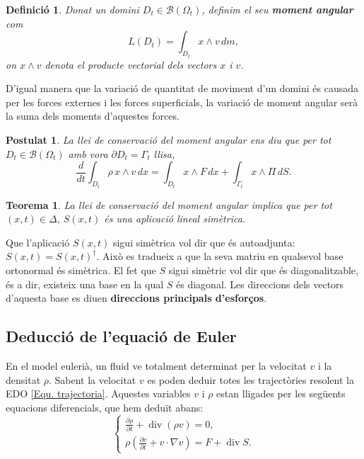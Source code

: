 \documentclass{article}
\numberwithin{equation}{section}
\DeclareMathOperator{\diver}{div}
\newtheorem{teorema}{Teorema}[section]
\newtheorem{definicio}{Definici\'{o}}[section]
\newtheorem{postulat}{Postulat}[section]
\begin{document}
\begin{definicio}
Donat un domini $D_t\in\mathcal{B}(\Omega_t)$, definim el seu \textbf{moment angular} com
\begin{equation}
L(D_t)=\int_{D_t}x\wedge v\,dm,
\end{equation}
on $x\wedge v$ denota el producte vectorial dels vectors $x$ i $v$.
\end{definicio}

D'igual manera que la variaci\'{o} de quantitat de moviment d'un domini \'{e}s causada per les forces externes i les forces superficials, la variaci\'{o} de moment angular ser\`{a} la suma dels moments d'aquestes forces.

\begin{postulat}
La llei de conservaci\'{o} del moment angular ens diu que per tot $D_t\in\mathcal{B}(\Omega_t)$ amb vora $\partial D_t=\Gamma_t$ llisa,
\begin{equation}
\frac{d}{dt}\int_{D_t}\rho\,x\wedge v\,dx=\int_{D_t}x\wedge F\,dx+\int_{\Gamma_t}x\wedge\Pi\,dS.
\end{equation}
\end{postulat}

\begin{teorema}
La llei de conservaci\'{o} del moment angular implica que per tot $(x,t)\in\Delta$, $S(x,t)$ \'{e}s una aplicaci\'{o} lineal sim\`{e}trica.
\end{teorema}

Que l'aplicaci\'{o} $S(x,t)$ sigui sim\`{e}trica vol dir que \'{e}s autoadjunta: $S(x,t)=S(x,t)^{\dagger}$. Aix\`{o} es tradueix a que la seva matriu en qualsevol base ortonormal \'{e}s sim\`{e}trica. El fet que $S$ sigui sim\`{e}tric vol dir que \'{e}s diagonalitzable, \'{e}s a dir, existeix una base en la qual $S$ \'{e}s diagonal. Les direccions dels vectors d'aquesta base es diuen \textbf{direccions principals d'esfor\c{c}os}.

\subsection{Deducci\'{o} de l'equaci\'{o} de Euler}

En el model euleri\`{a}, un fluid ve totalment determinat per la velocitat $v$ i la densitat $\rho$. Sabent la velocitat $v$ es poden deduir totes les traject\`{o}ries resolent la EDO \eqref{Equ. trajectoria}. Aquestes variables $v$ i $\rho$ estan lligades per les seg\"{u}ents equacions diferencials, que hem dedu\"{i}t abans:
\[\left\{\begin{array}{l}\displaystyle{\frac{\partial\rho}{\partial t}+\diver(\rho v)=0,}\\\displaystyle{\rho\left(\frac{\partial v}{\partial t}+v\cdot\nabla v\right)=F+\diver S}.\end{array}\right.\]
\end{document}
